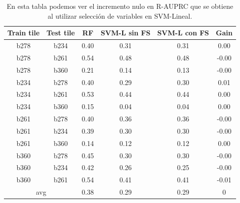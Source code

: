 \begin{table}[h!]
\centering
\begin{tabular}{|c|c|c|c|c|c|}
\hline
\textbf{Train tile} & \textbf{Test tile} & \textbf{RF} & \textbf{SVM-L sin FS} & \textbf{SVM-L con FS} & \textbf{Gain} \\ \hline
b278                & b234               & 0.40        & 0.31                  & 0.31                  & 0.00          \\ \hline
b278                & b261               & 0.54        & 0.48                  & 0.48                  & -0.00         \\ \hline
b278                & b360               & 0.21        & 0.14                  & 0.13                  & -0.00         \\ \hline
b234                & b278               & 0.40        & 0.29                  & 0.30                  & 0.01          \\ \hline
b234                & b261               & 0.53        & 0.44                  & 0.44                  & 0.00          \\ \hline
b234                & b360               & 0.15        & 0.04                  & 0.04                  & 0.00          \\ \hline
b261                & b278               & 0.40        & 0.36                  & 0.36                  & -0.00         \\ \hline
b261                & b234               & 0.39        & 0.30                  & 0.30                  & -0.00         \\ \hline
b261                & b360               & 0.14        & 0.12                  & 0.12                  & 0.00          \\ \hline
b360                & b278               & 0.45        & 0.30                  & 0.30                  & -0.00         \\ \hline
b360                & b234               & 0.42        & 0.26                  & 0.25                  & -0.00         \\ \hline
b360                & b261               & 0.54        & 0.41                  & 0.41                  & -0.01         \\ \hline
\multicolumn{2}{|c|}{avg}                & 0.38        & 0.29                  & 0.29                  & 0             \\ \hline
\end{tabular}
\caption{En esta tabla podemos ver el incremento nulo en R-AUPRC que se obtiene al utilizar selección de variables en SVM-Lineal. }
\label{tab:fs_comparison_l} 
\end{table}

